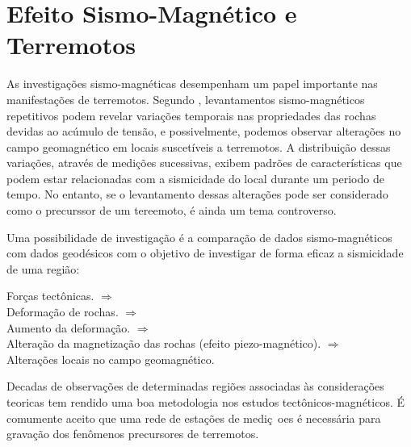 \section{Efeito Sismo-Magn\'etico e Terremotos}

As investiga\c{c}\~oes sismo-magn\'eticas desempenham um papel importante nas manifesta\c{c}\~oes de terremotos. Segundo \cite{Cukavac_2008}, levantamentos sismo-magn\'eticos repetitivos podem revelar varia\c{c}\~oes temporais nas propriedades das rochas devidas ao ac\'umulo de tens\~ao, e possivelmente, podemos observar altera\c{c}\~oes no campo geomagn\'etico em locais suscet\'iveis a terremotos. A distribui\c{c}\~ao dessas varia\c{c}\~oes, atrav\'es de medi\c{c}\~oes sucessivas, exibem padr\~oes de caracter\'isticas que podem estar relacionadas com a sismicidade do local durante um periodo de tempo. No entanto, se o levantamento dessas altera\c{c}\~oes pode ser considerado como o precurssor de um tereemoto, \'e ainda um tema controverso.

Uma possibilidade de investiga\c{c}\~ao \'e a compara\c{c}\~ao de dados sismo-magn\'eticos com dados geod\'esicos com o objetivo de investigar de forma eficaz a sismicidade de uma regi\~ao:
\begin{center}
For\c{c}as tect\^onicas. $\Rightarrow$\\
Deforma\c{c}\~ao de rochas. $\Rightarrow$\\
Aumento da deforma\c{c}\~ao. $\Rightarrow$\\
Altera\c{c}\~ao da magnetiza\c{c}\~ao das rochas (efeito piezo-magn\'etico). $\Rightarrow$\\
Altera\c{c}\~oes locais no campo geomagn\'etico.
\end{center}
Decadas de observa\c{c}\~oes de determinadas regi\~oes associadas \`as considera\c{c}\~oes teoricas tem rendido uma boa metodologia nos estudos tect\^onicos-magn\'eticos. \'E comumente aceito que uma rede de esta\c{c}\~oes de medi\c{c}~oes \'e necess\'aria para grava\c{c}\~ao dos fen\^omenos precursores de terremotos.

